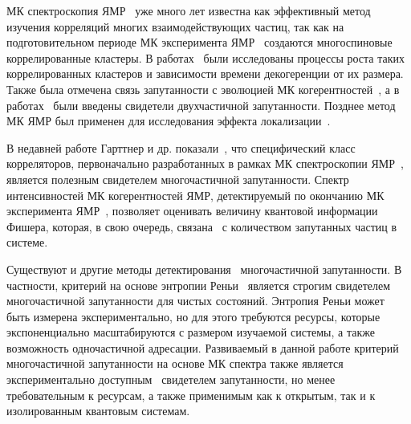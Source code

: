 


МК спектроскопия ЯМР~\cite{Baum1985} уже много лет известна как эффективный метод изучения корреляций многих взаимодействующих частиц,
так как на подготовительном периоде МК эксперимента ЯМР~\cite{Baum1985} создаются многоспиновые коррелированные кластеры.
В работах~\cite{Krojanski2004, Cho2006, Bochkin2018} были исследованы процессы роста таких коррелированных кластеров и зависимости времени декогеренции от их размера.
Также была отмечена связь запутанности с эволюцией МК когерентностей~\cite{Doronin2003, Furman2008, Furman2009},
а в работах~\cite{Feldman2008, Feldman2012} были введены свидетели двухчастичной запутанности.
Позднее метод МК ЯМР был применен для исследования эффекта локализации~\cite{Alvarez2010, Alvarez2013, Alvarez2015, Wei2018}.

В недавней работе Гарттнер и др. показали~\cite{Garttner2018},
что специфический класс корреляторов,
первоначально разработанных в рамках МК спектроскопии ЯМР~\cite{Baum1985},
является полезным свидетелем многочастичной запутанности.
Спектр интенсивностей МК когерентностей ЯМР,
детектируемый по окончанию МК эксперимента ЯМР~\cite{Baum1985},
позволяет оценивать величину квантовой информации Фишера,
которая, в свою очередь, связана~\cite{Toth2014} с количеством запутанных частиц в системе.

Существуют и другие методы детектирования~\cite{Guhne2009} многочастичной запутанности.
В частности, критерий на основе энтропии Реньи~\cite{Hosur2016, Fan2017}
является строгим свидетелем многочастичной запутанности для чистых состояний.
Энтропия Реньи может быть измерена экспериментально,
но для этого требуются ресурсы,
которые экспоненциально масштабируются с размером изучаемой системы,
а также возможность одночастичной адресации.
Развиваемый в данной работе критерий многочастичной запутанности на основе МК спектра
также является экспериментально доступным~\cite{Baum1985} свидетелем запутанности,
но менее требовательным к ресурсам,
а также применимым как к открытым,
так и к изолированным квантовым системам.


